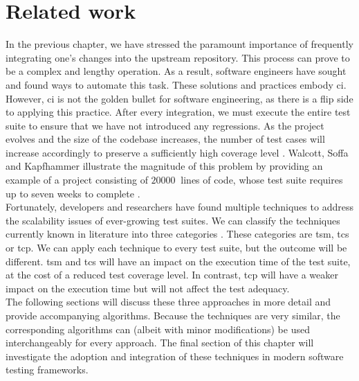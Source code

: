 
\chapter{Related work}
\label{ch:related-work}

In the previous chapter, we have stressed the paramount importance of frequently integrating one's changes into the upstream repository. This process can prove to be a complex and lengthy operation. As a result, software engineers have sought and found ways to automate this task. These solutions and practices embody \acrfull{ci}. However, \acrshort{ci} is not the golden bullet for software engineering, as there is a flip side to applying this practice. After every integration, we must execute the entire test suite to ensure that we have not introduced any regressions. As the project evolves and the size of the codebase increases, the number of test cases will increase accordingly to preserve a sufficiently high coverage level \cite{evaluationoftestsuiteminimization}. Walcott, Soffa and Kapfhammer illustrate the magnitude of this problem by providing an example of a project consisting of $\SI{20000}{}$ lines of code, whose test suite requires up to seven weeks to complete \cite{10.1145/1146238.1146240}.\\

\noindent Fortunately, developers and researchers have found multiple techniques to address the scalability issues of ever-growing test suites. We can classify the techniques currently known in literature into three categories \cite{evaluationoftestsuiteminimization}. These categories are \acrfull{tsm}, \acrfull{tcs} or \acrfull{tcp}. We can apply each technique to every test suite, but the outcome will be different. \acrshort{tsm} and \acrshort{tcs} will have an impact on the execution time of the test suite, at the cost of a reduced test coverage level. In contrast, \acrshort{tcp} will have a weaker impact on the execution time but will not affect the test adequacy.\\

\noindent The following sections will discuss these three approaches in more detail and provide accompanying algorithms. Because the techniques are very similar, the corresponding algorithms can (albeit with minor modifications) be used interchangeably for every approach. The final section of this chapter will investigate the adoption and integration of these techniques in modern software testing frameworks.\\

\clearpage

\newpage

\newpage

